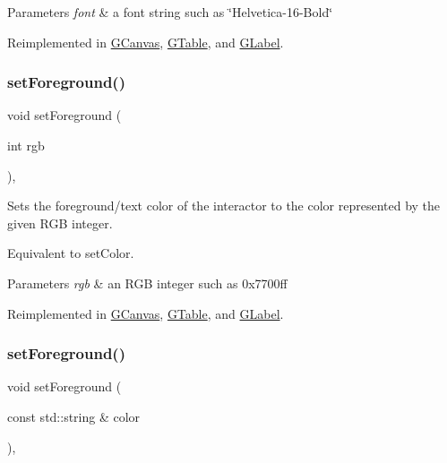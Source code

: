 \begin{DoxyParams}{Parameters}
{\em font} & a font string such as \char`\"{}\+Helvetica-\/16-\/\+Bold\char`\"{} \\
\hline
\end{DoxyParams}


Reimplemented in \mbox{\hyperlink{classGCanvas_ab39ef411fb13a52852ddd138c5932e2e}{G\+Canvas}}, \mbox{\hyperlink{classGTable_ab39ef411fb13a52852ddd138c5932e2e}{G\+Table}}, and \mbox{\hyperlink{classGLabel_ab39ef411fb13a52852ddd138c5932e2e}{G\+Label}}.

\mbox{\label{classGInteractor_a9eb856b5ff83a19df3831a31f15f4563}} 
\subsubsection{\texorpdfstring{set\+Foreground()}{setForeground()}\hspace{0.1cm}{\footnotesize\ttfamily [1/2]}}
{\footnotesize\ttfamily void set\+Foreground (\begin{DoxyParamCaption}\item[{int}]{rgb }\end{DoxyParamCaption})\hspace{0.3cm}{\ttfamily [virtual]}, {\ttfamily [inherited]}}



Sets the foreground/text color of the interactor to the color represented by the given R\+GB integer. 

Equivalent to set\+Color. 
\begin{DoxyParams}{Parameters}
{\em rgb} & an R\+GB integer such as 0x7700ff \\
\hline
\end{DoxyParams}


Reimplemented in \mbox{\hyperlink{classGCanvas_af9227e80cbfac55ce936fa5c99ffc954}{G\+Canvas}}, \mbox{\hyperlink{classGTable_af9227e80cbfac55ce936fa5c99ffc954}{G\+Table}}, and \mbox{\hyperlink{classGLabel_af9227e80cbfac55ce936fa5c99ffc954}{G\+Label}}.

\mbox{\label{classGInteractor_af59209aeadea6dfc6d97a2d8531f50e1}} 
\subsubsection{\texorpdfstring{set\+Foreground()}{setForeground()}\hspace{0.1cm}{\footnotesize\ttfamily [2/2]}}
{\footnotesize\ttfamily void set\+Foreground (\begin{DoxyParamCaption}\item[{const std\+::string \&}]{color }\end{DoxyParamCaption})\hspace{0.3cm}{\ttfamily [virtual]}, {\ttfamily [inherited]}}



